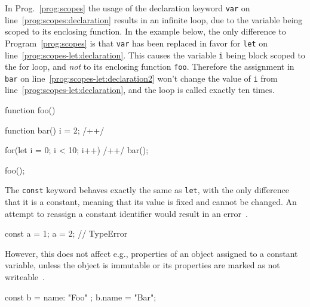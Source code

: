 \begin{program}
\caption{In Prog.~\ref{prog:scopes} the usage of the declaration keyword \texttt{var} on line~\ref{prog:scopes:declaration} results in an infinite loop, due to the variable being scoped to its enclosing function. In the example below, the only difference to Program~\ref{prog:scopes} is that \texttt{var} has been replaced in favor for \texttt{let} on line~\ref{prog:scopes-let:declaration}. This causes the variable \texttt{i} being block scoped to the for loop, and \emph{not} to its enclosing function \texttt{foo}. Therefore the assignment in \texttt{bar} on line~\ref{prog:scopes-let:declaration2} won't change the value of \texttt{i} from line~\ref{prog:scopes-let:declaration}, and the loop is called exactly ten times.}
\label{prog:scopes-let}
\begin{JsCode}
function foo() {

  function bar() {
    i = 2; /+\label{prog:scopes-let:declaration2}+/
  }
  
  for(let i = 0; i < 10; i++) { /+\label{prog:scopes-let:declaration}+/
    bar();
  }
  
}

foo();
\end{JsCode}
\end{program}

The \texttt{const} keyword behaves exactly the same as \texttt{let}, with the only difference that it is a constant, meaning that its value is fixed and cannot be changed. An attempt to reassign a constant identifier would result in an error~\cite[p.~39]{YDKJS:ScopesAndClosures:Simpson:2014}.
\begin{JsCode}[numbers=none]
const a = 1;
a = 2; // TypeError
\end{JsCode}
However, this does not affect e.g., properties of an object assigned to a constant variable, unless the object is immutable or its properties are marked as not writeable~\cite{const:MDN:2017}.
\begin{JsCode}[numbers=none]
const b = { name: "Foo" };
b.name = "Bar";
\end{JsCode}


